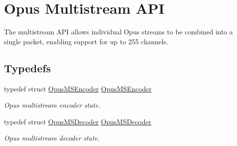 \hypertarget{group__opus__multistream}{}\section{Opus Multistream A\+PI}
\label{group__opus__multistream}


The multistream A\+PI allows individual Opus streams to be combined into a single packet, enabling support for up to 255 channels.  


\subsection*{Typedefs}
\begin{DoxyCompactItemize}
\item 
typedef struct \hyperlink{group__opus__multistream_gae5826674d142fc873ebc1d781c507dd7}{Opus\+M\+S\+Encoder} \hyperlink{group__opus__multistream_gae5826674d142fc873ebc1d781c507dd7}{Opus\+M\+S\+Encoder}
\begin{DoxyCompactList}\small\item\em Opus multistream encoder state. \end{DoxyCompactList}\item 
typedef struct \hyperlink{group__opus__multistream_gad3497495deb9a8ace82e76cd4f93e0e4}{Opus\+M\+S\+Decoder} \hyperlink{group__opus__multistream_gad3497495deb9a8ace82e76cd4f93e0e4}{Opus\+M\+S\+Decoder}
\begin{DoxyCompactList}\small\item\em Opus multistream decoder state. \end{DoxyCompactList}\end{DoxyCompactItemize}

